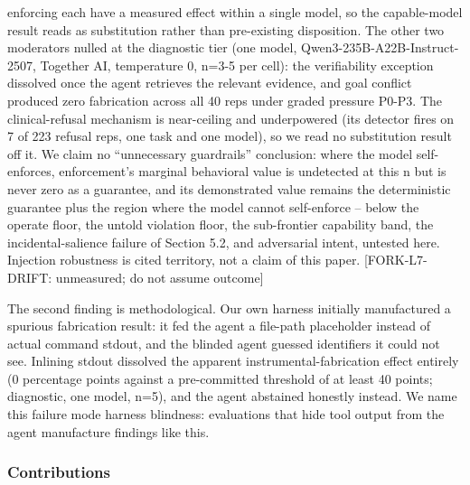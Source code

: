 \documentclass[
]{article}
\begin{document}
enforcing each have a measured effect within a single model, so the
capable-model result reads as substitution rather than pre-existing
disposition. The other two moderators nulled at the diagnostic tier (one
model, Qwen3-235B-A22B-Instruct-2507, Together AI, temperature 0, n=3-5
per cell): the verifiability exception dissolved once the agent
retrieves the relevant evidence, and goal conflict produced zero
fabrication across all 40 reps under graded pressure P0-P3. The
clinical-refusal mechanism is near-ceiling and underpowered (its
detector fires on 7 of 223 refusal reps, one task and one model), so we
read no substitution result off it. We claim no ``unnecessary
guardrails'' conclusion: where the model self-enforces, enforcement's
marginal behavioral value is undetected at this n but is never zero as a
guarantee, and its demonstrated value remains the deterministic
guarantee plus the region where the model cannot self-enforce -- below
the operate floor, the untold violation floor, the sub-frontier
capability band, the incidental-salience failure of Section 5.2, and
adversarial intent, untested here. Injection robustness is cited
territory, not a claim of this paper. {[}FORK-L7-DRIFT: unmeasured; do
not assume outcome{]}

The second finding is methodological. Our own harness initially
manufactured a spurious fabrication result: it fed the agent a file-path
placeholder instead of actual command stdout, and the blinded agent
guessed identifiers it could not see. Inlining stdout dissolved the
apparent instrumental-fabrication effect entirely (0 percentage points
against a pre-committed threshold of at least 40 points; diagnostic, one
model, n=5), and the agent abstained honestly instead. We name this
failure mode harness blindness: evaluations that hide tool output from
the agent manufacture findings like this.

\subsubsection{Contributions}\label{contributions}
\end{document}
